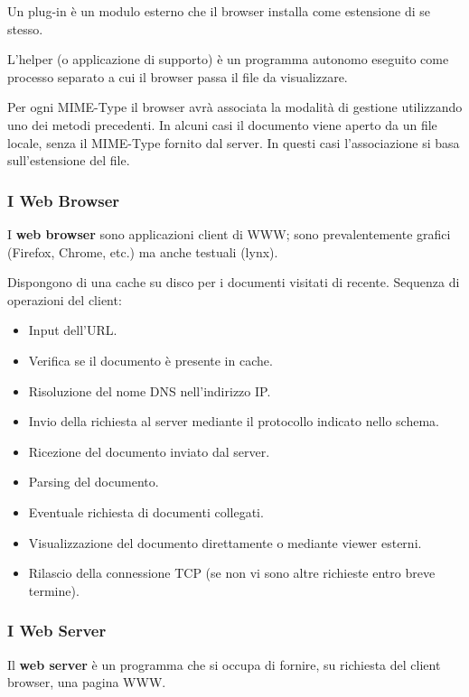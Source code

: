             Un plug-in è un modulo esterno che il browser installa come estensione di se stesso.
        
            L'helper (o applicazione di supporto) è un programma autonomo eseguito come processo separato a cui il browser passa il file da visualizzare.
        
            Per ogni MIME-Type il browser avrà associata la modalità di gestione utilizzando uno dei metodi precedenti. In alcuni casi il documento viene aperto da un file locale, senza il MIME-Type fornito dal server. In questi casi l'associazione si basa sull'estensione del file.

        \subsubsection{I Web Browser}
            I \textbf{web browser} sono applicazioni client di WWW; sono prevalentemente grafici (Firefox, Chrome, etc.) ma anche testuali (lynx).
        
            Dispongono di una cache su disco per i documenti visitati di recente. Sequenza di operazioni del client:
            \begin{itemize}
                \item Input dell'URL.
                \item Verifica se il documento è presente in cache.
                \item Risoluzione del nome DNS nell'indirizzo IP.
                \item Invio della richiesta al server mediante il protocollo indicato nello schema.
                \item Ricezione del documento inviato dal server.
                \item Parsing del documento.
                \item Eventuale richiesta di documenti collegati.
                \item Visualizzazione del documento direttamente o mediante viewer esterni.
                \item Rilascio della connessione TCP (se non vi sono altre richieste entro breve termine).
            \end{itemize}
        
        \subsubsection{I Web Server}
            Il \textbf{web server} è un programma che si occupa di fornire, su richiesta del client browser, una pagina WWW.
        
